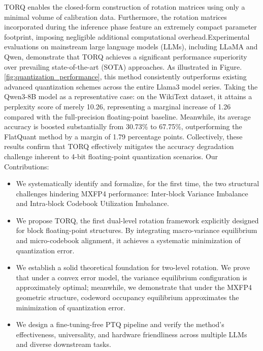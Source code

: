 TORQ enables the closed-form construction of rotation matrices using only a minimal volume of calibration data. Furthermore, the rotation matrices incorporated during the inference phase feature an extremely compact parameter footprint, imposing negligible additional computational overhead.Experimental evaluations on mainstream large language models (LLMs), including LLaMA and Qwen, demonstrate that TORQ achieves a significant performance superiority over prevailing state-of-the-art (SOTA) approaches. As illustrated in Figure.\ref{fig:quantization_performance}, this method consistently outperforms existing advanced quantization schemes across the entire Llama3 model series. Taking the Qwen3-8B model as a representative case: on the WikiText dataset, it attains a perplexity score of merely 10.26, representing a marginal increase of 1.26 compared with the full-precision floating-point baseline. Meanwhile, its average accuracy is boosted substantially from 30.73\% to 67.75\%, outperforming the FlatQuant method by a margin of 1.79 percentage points. Collectively, these results confirm that TORQ effectively mitigates the accuracy degradation challenge inherent to 4-bit floating-point quantization scenarios.
Our Contributions:
\begin{itemize}
    \item We systematically identify and formalize, for the first time, the two structural challenges hindering MXFP4 performance: Inter-block Variance Imbalance and Intra-block Codebook Utilization Imbalance.
    \item We propose TORQ, the first dual-level rotation framework explicitly designed for block floating-point structures. By integrating macro-variance equilibrium and micro-codebook alignment, it achieves a systematic minimization of quantization error.
    \item We establish a solid theoretical foundation for two-level rotation. We prove that under a convex error model, the variance equilibrium configuration is approximately optimal; meanwhile, we demonstrate that under the MXFP4 geometric structure, codeword occupancy equilibrium approximates the minimization of quantization error.
    \item We design a fine-tuning-free PTQ pipeline and verify the method's effectiveness, universality, and hardware friendliness across multiple LLMs and diverse downstream tasks.
\end{itemize}